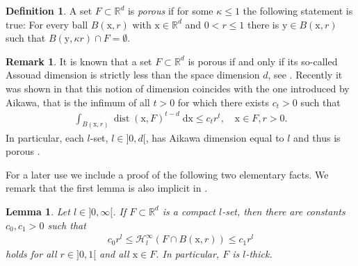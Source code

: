 \documentclass[10pt,leqno]{amsart}
\newtheorem{lemma}[theorem]{Lemma}
\theoremstyle{definition}
\newtheorem{definition}[theorem]{Definition}
\newtheorem{remark}[theorem]{Remark}
\numberwithin{equation}{section}
\begin{document}
\begin{definition} \label{d-porous}
A set $F \subset {{\mathbb R}}^d$ is \emph{porous} if for some $\kappa \leq 1$ the
following statement is true: For every ball $B({{\mathrm x}},r)$ with ${{\mathrm x}} \in {{\mathbb R}}^d$ and $0
< r \leq 1$ there is ${{\mathrm y}} \in B({{\mathrm x}},r)$ such that $B({{\mathrm y}}, \kappa r) \cap F =
\emptyset$.
\end{definition}

\begin{remark} \label{r-porous}
It is known that a set $F \subset {{\mathbb R}}^d$ is porous if and only if its so-called
Assouad dimension is strictly less than the space dimension $d$, see
\cite[Thm.~5.2]{luukkainen}. Recently it was shown in \cite{juha3} that this
notion of dimension coincides with the one introduced by Aikawa, that is the
infimum of all $t>0$ for which there exists $c_t > 0$ such that
\begin{align*}
 \int_{B({{\mathrm x}},r)} {\operatorname{dist}}({{\mathrm x}},F)^{t-d} \; {{\mathrm d}} {{\mathrm x}} \leq c_t r^t, \quad {{\mathrm x}} \in F, r> 0.
\end{align*}
In particular, each $l$-set, $l \in {]0,d[}$, has Aikawa dimension equal to
$l$ and thus is porous \cite[Lem.~2.1]{juha2}.
\end{remark}

For a later use we include a proof of the following two elementary facts. We
remark that the first lemma is also implicit in \cite[Lem.~2]{carlmaz}.

\begin{lemma}
\label{l-lsets with hausdorff content}
Let $l \in {]0,\infty[}$. If $F \subset {{\mathbb R}}^d$ is a compact $l$-set, then there
are constants $c_0, c_1 > 0$ such that
\begin{align*}
c_0 r^l \le {\mathcal{H}}^\infty_l(F \cap B({{\mathrm x}},r)) \le c_1 r^l
\end{align*}
holds for all $r \in {]0,1[}$ and all ${{\mathrm x}} \in F$. In particular, $F$ is
$l$-thick.
\end{lemma}
\end{document}
